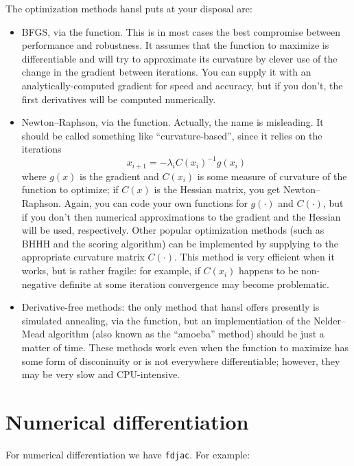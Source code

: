 The optimization methods hansl puts at your disposal are:
\begin{itemize}
\item BFGS, via the  function. This is in most cases
  the best compromise between performance and robustness. It assumes
  that the function to maximize is differentiable and will try to
  approximate its curvature by clever use of the change in the
  gradient between iterations. You can supply it with an
  analytically-computed gradient for speed and accuracy, but if you
  don't, the first derivatives will be computed numerically.
\item Newton--Raphson, via the  function. Actually, the
  name is misleading. It should be called something like
  ``curvature-based'', since it relies on the iterations
  \[
    x_{i+1} = -\lambda_i C(x_i)^{-1} g(x_i)
  \]
  where $g(x)$ is the gradient and $C(x_i)$ is some measure of
  curvature of the function to optimize; if $C(x)$ is the Hessian
  matrix, you get Newton--Raphson. Again, you can code your own
  functions for $g(\cdot)$ and $C(\cdot)$, but if you don't then
  numerical approximations to the gradient and the Hessian will be
  used, respectively. Other popular optimization methods (such as BHHH
  and the scoring algorithm) can be implemented by supplying to
   the appropriate curvature matrix $C(\cdot)$. This
  method is very efficient when it works, but is rather fragile: for
  example, if $C(x_i)$ happens to be non-negative definite at some
  iteration convergence may become problematic.
\item Derivative-free methods: the only method that hansl offers
  presently is simulated annealing, via the  function,
  but an implementiation of the Nelder--Mead algorithm (also known as
  the ``amoeba'' method) should be just a matter of time. These
  methods work even when the function to maximize has some form of
  disconinuity or is not everywhere differentiable; however, they may
  be very slow and CPU-intensive.
\end{itemize}

\section{Numerical differentiation}
\label{sec:hp-numdiff}

For numerical differentiation we have \texttt{fdjac}. For example:

